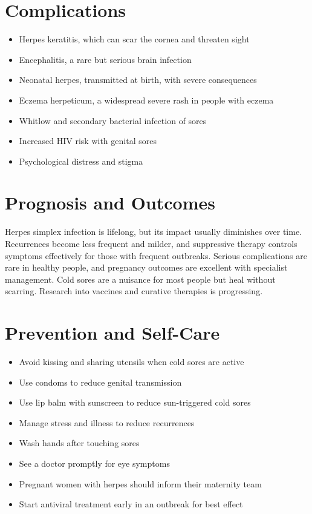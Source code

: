 \section*{Complications}
\begin{itemize}
    \item Herpes keratitis, which can scar the cornea and threaten sight
    \item Encephalitis, a rare but serious brain infection
    \item Neonatal herpes, transmitted at birth, with severe consequences
    \item Eczema herpeticum, a widespread severe rash in people with eczema
    \item Whitlow and secondary bacterial infection of sores
    \item Increased HIV risk with genital sores
    \item Psychological distress and stigma
\end{itemize}

\section*{Prognosis and Outcomes}
Herpes simplex infection is lifelong, but its impact usually diminishes over time. Recurrences become less frequent and milder, and suppressive therapy controls symptoms effectively for those with frequent outbreaks. Serious complications are rare in healthy people, and pregnancy outcomes are excellent with specialist management. Cold sores are a nuisance for most people but heal without scarring. Research into vaccines and curative therapies is progressing.

\section*{Prevention and Self-Care}
\begin{itemize}
    \item Avoid kissing and sharing utensils when cold sores are active
    \item Use condoms to reduce genital transmission
    \item Use lip balm with sunscreen to reduce sun-triggered cold sores
    \item Manage stress and illness to reduce recurrences
    \item Wash hands after touching sores
    \item See a doctor promptly for eye symptoms
    \item Pregnant women with herpes should inform their maternity team
    \item Start antiviral treatment early in an outbreak for best effect
\end{itemize}

